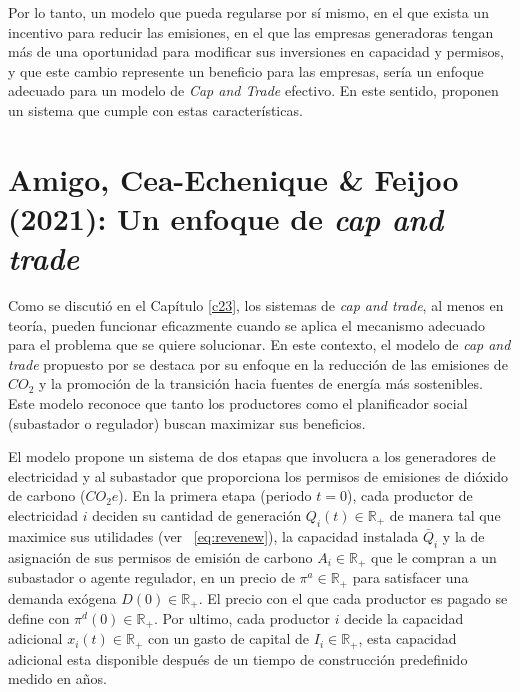 Por lo tanto, un modelo que pueda regularse por sí mismo, en el que exista un incentivo para reducir las emisiones, en el que las empresas generadoras tengan más de una oportunidad para modificar sus inversiones en capacidad y permisos, y que este cambio represente un beneficio para las empresas, sería un enfoque adecuado para un modelo de \textit{Cap and Trade} efectivo. En este sentido,  proponen un sistema que cumple con estas características.

\section{Amigo, Cea-Echenique \& Feijoo (2021): Un enfoque de \textit{cap and trade}}\label{c24}

Como se discutió en el Capítulo \ref{c23}, los sistemas de \textit{cap and trade}, al menos en teoría, pueden funcionar eficazmente cuando se aplica el mecanismo adecuado para el problema que se quiere solucionar. En este contexto, el modelo de \textit{cap and trade} propuesto por  se destaca por su enfoque en la reducción de las emisiones de $CO_2$ y la promoción de la transición hacia fuentes de energía más sostenibles. Este modelo reconoce que tanto los productores como el planificador social (subastador o regulador) buscan maximizar sus beneficios.
\vspace{2.5mm}

El modelo propone un sistema de dos etapas que involucra a los generadores de electricidad y al subastador que proporciona los permisos de emisiones de dióxido de carbono ($CO_2 e$). En la primera etapa (periodo $t=0$), cada productor de electricidad $i$ deciden su cantidad de generación $Q_i(t)\in\mathbb{R}_+$ de manera tal que maximice sus utilidades (ver ~\ref{eq:revenew}), la capacidad instalada $\bar{Q}_i$ y la de asignación de sus permisos de emisión de carbono $A_i\in\mathbb{R}_+$ que le compran a un subastador o agente regulador, en un precio de $\pi^{a}\in\mathbb{R}_+$  para satisfacer una demanda exógena $D(0)\in\mathbb{R}_+$. El precio con el que cada productor es pagado se define con $\pi^d(0)\in\mathbb{R}_+$. Por ultimo, cada productor $i$ decide la capacidad adicional $x_i(t)\in\mathbb{R}_+$ con un gasto de capital de $I_i\in\mathbb{R}_+$, esta capacidad adicional esta disponible después de un tiempo de construcción predefinido medido en años.
\vspace{2.5mm}

